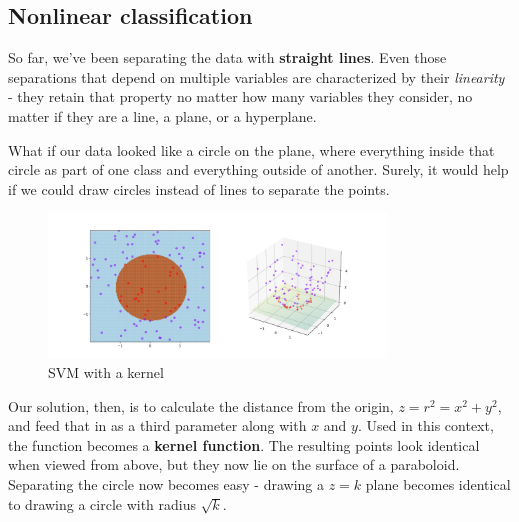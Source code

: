 \documentclass{article}
\begin{document}
\subsection{Nonlinear classification}
So far, we've been separating the data with \textbf{straight lines}. Even those separations that depend on multiple variables are characterized by their \textit{linearity} - they retain that property no matter how many variables they consider, no matter if they are a line, a plane, or a hyperplane.

What if our data looked like a circle on the plane, where everything inside that circle as part of one class and everything outside of another. Surely, it would help if we could draw circles instead of lines to separate the points.
\begin{figure}[!htb]
    \vspace{-10pt}
    \begin{center}
        \includegraphics[width=0.8\textwidth]{kernel.png}
    \end{center}
    \vspace{-25pt}
    \caption{SVM with a kernel}
    \vspace{-10pt}
\end{figure}

Our solution, then, is to calculate the distance from the origin, $z = r^2 = x^2 + y^2$, and feed that in as a third parameter along with $x$ and $y$. Used in this context, the function becomes a \textbf{kernel function}. The resulting points look identical when viewed from above, but they now lie on the surface of a paraboloid. Separating the circle now becomes easy - drawing a $z = k$ plane becomes identical to drawing a circle with radius $\sqrt{k}$.
\end{document}
